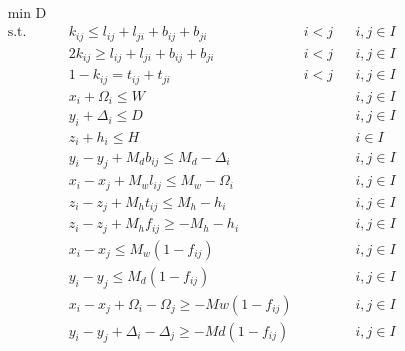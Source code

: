 \begin{align}
	& \underset{}{\text{min D}} \label{equaDDD}\\
	  & \text{s.t.} &   & k_{ij} \leq l_{ij} + l_{ji} + b_{ij} + b_{ji}                                & i < j    &   & i,j \in I \label{equa53} \\
	  &             &   & 2 k_{ij} \geq l_{ij} + l_{ji} + b_{ij} + b_{ji}                              & i < j    &   & i,j \in I \label{equa54} \\
	  &             &   & 1 - k_{ij} = t_{ij} + t_{ji}                                                 & i < j    &   & i,j \in I \label{equa55} \\
	  &             &   & x_i + \Omega_i \leq W                                                        &          &   & i,j \in I \label{equa56} \\
	  &             &   & y_i + \Delta_i \leq D                                                        &          &   & i,j \in I \label{equa57} \\
	  &             &   & z_i + h_i \leq H                                                             &          &   & i \in I \label{equa58}   \\	
	  &             &   & y_i - y_j + M_d b_{ij} \leq M_d - \Delta_i                                   &          &   & i,j \in I \label{equa59} \\
	  &             &   & x_i - x_j + M_w l_{ij} \leq M_w - \Omega_i                                   &          &   & i,j \in I \label{equa60} \\
	  &             &   & z_i - z_j + M_h t_{ij} \leq M_h - h_i                                        &          &   & i,j \in I \label{equa61} \\
	  &             &   & z_i - z_j + M_h f_{ij} \geq - M_h - h_i                                      &          &   & i,j \in I \label{equa62} \\
	  &             &   & x_i - x_j \leq M_w (1-f_{ij})                                                &          &   & i,j \in I \label{equa63} \\
	  &             &   & y_i - y_j \leq M_d (1-f_{ij})                                                &          &   & i,j \in I \label{equa64} \\
	  &             &   & x_i - x_j + \Omega_i - \Omega_j \geq - Mw(1 - f_{ij})                        &          &   & i,j \in I\label{equa65}  \\
	  &             &   & y_i - y_j + \Delta_i - \Delta_j \geq - Md(1 - f_{ij})                        &          &   & i,j \in I\label{equa66}  \\

\end{align}
